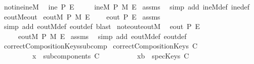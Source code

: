 \begin{isabellebody}
\endisatagproof
{\isafoldproof}%
%
\isadelimproof
\isanewline
%
\endisadelimproof
\isanewline
{}\isamarkupfalse%
\ not{\isacharunderscore}ine{\isacharunderscore}ineM{\isacharcolon}\isanewline
{}\ {\isachardoublequoteopen}{\isasymnot}\ ine\ P\ E{\isachardoublequoteclose}\isanewline
{}\ \ \ \ {\isachardoublequoteopen}{\isasymnot}\ ineM\ P\ M\ E{\isachardoublequoteclose}\isanewline
%
\isadelimproof
%
\endisadelimproof
%
\isatagproof
{}\isamarkupfalse%
\ assms\ \isamarkupfalse%
\ {\isacharparenleft}simp\ add{\isacharcolon}\ ineM{\isacharunderscore}def\ ine{\isacharunderscore}def{\isacharparenright}%
\endisatagproof
{\isafoldproof}%
%
\isadelimproof
\isanewline
%
\endisadelimproof
\isanewline
{}\isamarkupfalse%
\ eoutM{\isacharunderscore}eout{\isacharcolon}\isanewline
{}\ {\isachardoublequoteopen}eoutM\ P\ M\ E{\isachardoublequoteclose}\isanewline
{}\ \ \ \ {\isachardoublequoteopen}eout\ P\ E{\isachardoublequoteclose}\isanewline
%
\isadelimproof
%
\endisadelimproof
%
\isatagproof
{}\isamarkupfalse%
\ assms\ \isamarkupfalse%
\ {\isacharparenleft}simp\ add{\isacharcolon}\ eoutM{\isacharunderscore}def\ eout{\isacharunderscore}def{\isacharcomma}\ blast{\isacharparenright}%
\endisatagproof
{\isafoldproof}%
%
\isadelimproof
\isanewline
%
\endisadelimproof
\isanewline
{}\isamarkupfalse%
\ not{\isacharunderscore}eout{\isacharunderscore}eoutM{\isacharcolon}\isanewline
{}\ {\isachardoublequoteopen}{\isasymnot}\ eout\ P\ E{\isachardoublequoteclose}\isanewline
{}\ \ \ \ {\isachardoublequoteopen}{\isasymnot}\ eoutM\ P\ M\ E{\isachardoublequoteclose}\isanewline
%
\isadelimproof
%
\endisadelimproof
%
\isatagproof
{}\isamarkupfalse%
\ assms\ \isamarkupfalse%
\ {\isacharparenleft}simp\ add{\isacharcolon}\ eoutM{\isacharunderscore}def\ eout{\isacharunderscore}def{\isacharparenright}%
\endisatagproof
{\isafoldproof}%
%
\isadelimproof
\isanewline
%
\endisadelimproof
\isanewline
{}\isamarkupfalse%
\ correctCompositionKeys{\isacharunderscore}subcomp{}{\isacharcolon}\isanewline
{}\ {\isachardoublequoteopen}correctCompositionKeys\ C{\isachardoublequoteclose}\isanewline
\ \ \ \ \ \ \ \ \ {\isachardoublequoteopen}x\ {\isasymin}\ subcomponents\ C{\isachardoublequoteclose}\ \isanewline
\ \ \ \ \ \ \ \ \ {\isachardoublequoteopen}xb\ {\isasymin}\ specKeys\ C{\isachardoublequoteclose}\isanewline

\end{isabellebody}

